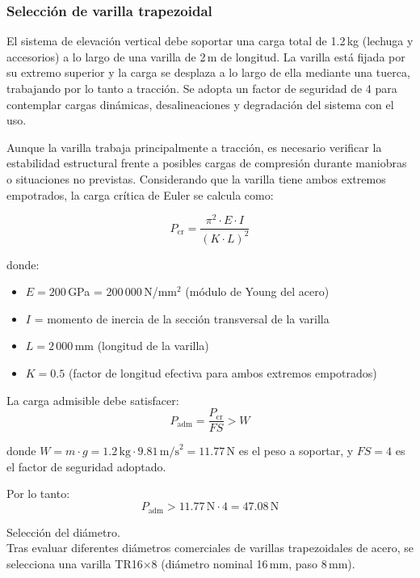 \subsubsection{Selección de varilla trapezoidal} 
\label{sec:mov_vertical}
El sistema de elevación vertical debe soportar una carga total de 1.2\,kg (lechuga y accesorios) a lo largo de una varilla de 2\,m de longitud. La varilla está fijada por su extremo superior y la carga se desplaza a lo largo de ella mediante una tuerca, trabajando por lo tanto a tracción. Se adopta un factor de seguridad de 4 para contemplar cargas dinámicas, desalineaciones y degradación del sistema con el uso.

Aunque la varilla trabaja principalmente a tracción, es necesario verificar la estabilidad estructural frente a posibles cargas de compresión durante maniobras o situaciones no previstas. Considerando que la varilla tiene ambos extremos empotrados, la carga crítica de Euler se calcula como:

\begin{equation}
P_{\text{cr}} = \frac{\pi^2 \cdot E \cdot I}{(K \cdot L)^2}
\label{eq:euler_pandeo}
\end{equation}

donde:
\begin{itemize}[label=$\bullet$]
    \item $E = 200$\,GPa = 200\,000\,N/mm$^2$ (módulo de Young del acero)
    \item $I$ = momento de inercia de la sección transversal de la varilla
    \item $L = 2\,000$\,mm (longitud de la varilla)
    \item $K = 0.5$ (factor de longitud efectiva para ambos extremos empotrados)
\end{itemize}

La carga admisible debe satisfacer:
\begin{equation}
P_{\text{adm}} = \frac{P_{\text{cr}}}{FS} > W
\end{equation}

donde $W = m \cdot g = 1.2\,\text{kg} \cdot 9.81\,\text{m/s}^2 = 11.77$\,N es el peso a soportar, y $FS = 4$ es el factor de seguridad adoptado.

Por lo tanto:
\[P_{\text{adm}} > 11.77\,\text{N} \cdot 4 = 47.08\,\text{N}\]

Selección del diámetro.\\
\noindent
Tras evaluar diferentes diámetros comerciales de varillas trapezoidales de acero, se selecciona una varilla TR16$\times$8 (diámetro nominal 16\,mm, paso 8\,mm).

